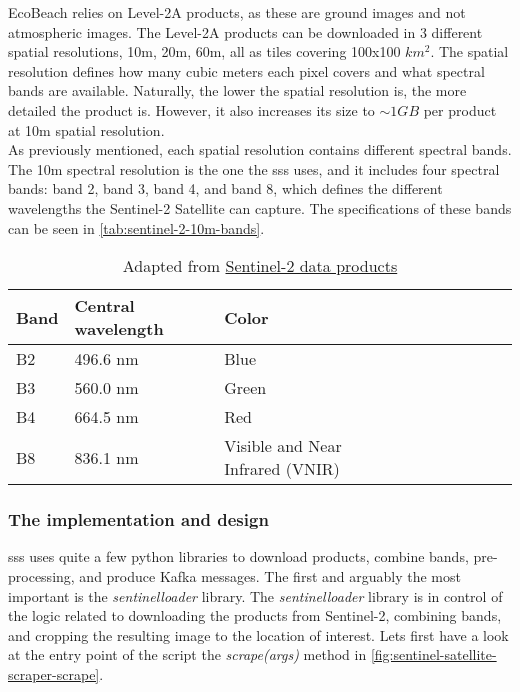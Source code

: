 EcoBeach relies on Level-2A products, as these are ground images and not atmospheric images. The Level-2A products can be downloaded in 3 different spatial resolutions, 10m, 20m, 60m, all as tiles covering 100x100 $km^2$. The spatial resolution defines how many cubic meters each pixel covers and what spectral bands are available. Naturally, the lower the spatial resolution is, the more detailed the product is. However, it also increases its size to $\sim 1GB$ per product at 10m spatial resolution. \\

As previously mentioned, each spatial resolution contains different spectral bands. The 10m spectral resolution is the one the \acrshort{sss} uses, and it includes four spectral bands: band 2, band 3, band 4, and band 8, which defines the different wavelengths the Sentinel-2 Satellite can capture. The specifications of these bands can be seen in \autoref{tab:sentinel-2-10m-bands}.
\cite{sentinel-2-product-specification}

\begin{table}[h!]
    \centering
    \begin{tabular}{| p{0.1\linewidth} | p{0.3\linewidth} | p{0.3\linewidth} | p{0.3\linewidth} |}
        \hline
        \textbf{Band} & \textbf{Central wavelength} & \textbf{Color}                   \\ \hline
        B2            & 496.6 nm                    & Blue                             \\ \hline
        B3            & 560.0 nm                    & Green                            \\ \hline
        B4            & 664.5 nm                    & Red                              \\ \hline
        B8            & 836.1 nm                    & Visible and Near Infrared (VNIR) \\ \hline
    \end{tabular}
    \caption{Adapted from \href{https://sentinels.copernicus.eu/web/sentinel/missions/sentinel-2/data-products}{Sentinel-2 data products}}
    \label{tab:sentinel-2-10m-bands}
\end{table}

\subsubsection{The implementation and design}

\acrshort{sss} uses quite a few python libraries to download products, combine bands, pre-processing, and produce Kafka messages. The first and arguably the most important is the \emph{sentinelloader} library. The \emph{sentinelloader} library is in control of the logic related to downloading the products from Sentinel-2, combining bands, and cropping the resulting image to the location of interest. Lets first have a look at the entry point of the script the \emph{scrape(args)} method in \autoref{fig:sentinel-satellite-scraper-scrape}.

